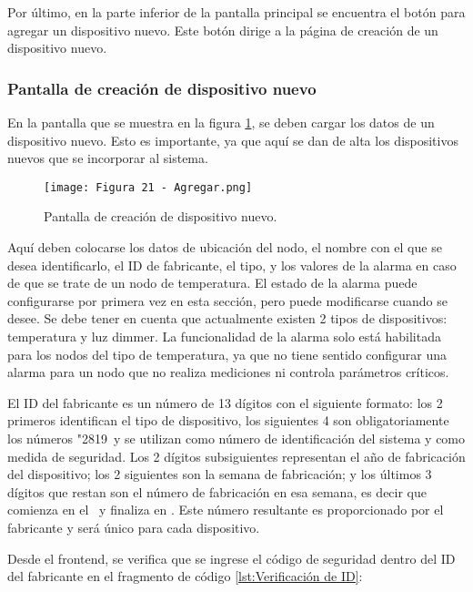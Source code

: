 Por último, en la parte inferior de la pantalla principal se encuentra el botón para agregar un dispositivo nuevo. Este botón dirige a la página de creación de un dispositivo nuevo.

\subsubsection{Pantalla de creación de dispositivo nuevo}

En la pantalla que se muestra en la figura \ref{fig:21}, se deben cargar los datos de un dispositivo nuevo. Esto es importante, ya que aquí se dan de alta los dispositivos nuevos que se incorporar al sistema.

\begin{figure}[h]
\centering
\texttt{[image: Figura 21 - Agregar.png]}
\caption[Pantalla home]{Pantalla de creación de dispositivo nuevo.}
\label{fig:21}
\end{figure}

Aquí deben colocarse los datos de ubicación del nodo, el nombre con el que se desea identificarlo, el ID de fabricante, el tipo, y los valores de la alarma en caso de que se trate de un nodo de temperatura. El estado de la alarma puede configurarse por primera vez en esta sección, pero puede modificarse cuando se desee. Se debe tener en cuenta que actualmente existen 2 tipos de dispositivos: temperatura y luz dimmer. La funcionalidad de la alarma solo está habilitada para los nodos del tipo de temperatura, ya que no tiene sentido configurar una alarma para un nodo que no realiza mediciones ni controla parámetros críticos.

El ID del fabricante es un número de 13 dígitos con el siguiente formato: los 2 primeros identifican el tipo de dispositivo, los siguientes 4 son obligatoriamente los números "2819\textquotedbl\ y se utilizan como número de identificación del sistema y como medida de seguridad. Los 2 dígitos subsiguientes representan el año de fabricación del dispositivo; los 2 siguientes son la semana de fabricación; y los últimos 3 dígitos que restan son el número de fabricación en esa semana, es decir que comienza en el \textquotedbl\ y finaliza en \textquotedbl. Este número resultante es proporcionado por el fabricante y será único para cada dispositivo.

Desde el frontend, se verifica que se ingrese el código de seguridad dentro del ID del fabricante en el fragmento de código \ref{lst:Verificación de ID}:


